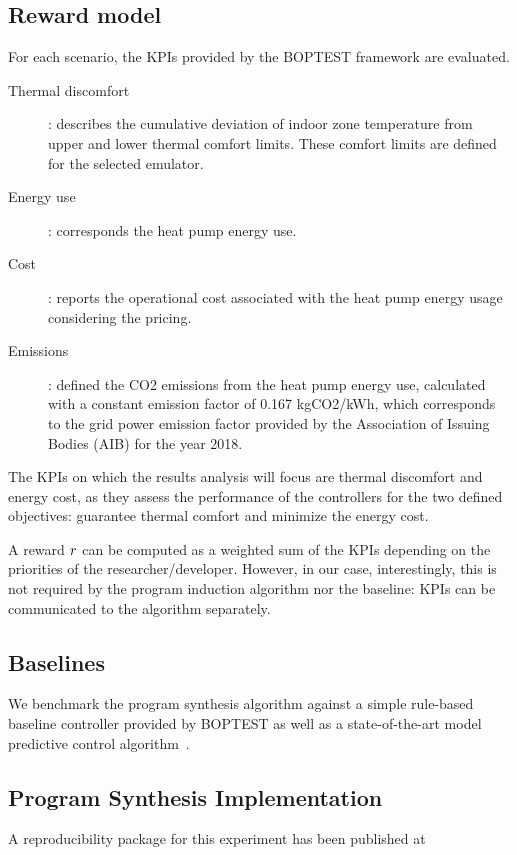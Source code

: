 \subsection{Reward model}

For each scenario, the KPIs provided by the BOPTEST framework are evaluated.
 \begin{description}
     \item[Thermal discomfort]: describes the cumulative deviation of indoor zone temperature from upper and lower thermal comfort limits. These comfort limits are defined for the selected emulator.
     \item[Energy use]: corresponds the heat pump energy use.
     \item[Cost]: reports the operational cost associated with the heat pump energy usage considering the pricing.
     \item[Emissions]: defined the CO2 emissions from the heat pump energy use, calculated with a constant emission factor of 0.167 kgCO2/kWh, which corresponds to the grid power emission factor provided by the Association of Issuing Bodies (AIB) for the year 2018. 
 \end{description}
The KPIs on which the results analysis will focus are thermal discomfort and energy cost, as they assess the performance of the controllers for the two defined objectives: guarantee thermal comfort and minimize the energy cost.

A reward $r$ can be computed as a weighted sum of the KPIs depending on the priorities of the researcher/developer.
However, in our case, interestingly, this is not required by the program induction algorithm nor the baseline: KPIs can be communicated to the algorithm separately.

\subsection{Baselines}

We benchmark the program synthesis algorithm against a simple rule-based baseline controller provided by BOPTEST as well as a state-of-the-art model predictive control algorithm~\cite{zabalaComparisonProgramSynthesis2023}.

\newpage
\subsection{Program Synthesis Implementation}
\label{sec:boptest-impl}

\begin{remark}
  A reproducibility package for this experiment has been published at \cite{vadimGPTcoder}
\end{remark}

